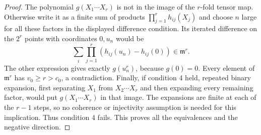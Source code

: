 \documentclass[11pt,a4paper]{article}
\theoremstyle{definition}
\begin{document}
\begin{proof}
The polynomial $g(X_1\cdots X_r)$ is not in the image of the
$r$-fold tensor map. Otherwise write it as a finite sum of
products $\prod_{j=1}^r h_{ij}(X_j)$ and choose $n$ large for
all these factors in the displayed difference condition.
Its iterated difference on the $2^r$ points with coordinates
$0,u_n$ would be
\[
 \sum_i\prod_{j=1}^r(h_{ij}(u_n)-h_{ij}(0))\in\mathfrak m^r.
\]
The other expression gives exactly $g(u_n^r)$, because $g(0)=0$.
Every element of $\mathfrak m^r$ has $v_0\ge r>c_0$, a
contradiction. Finally, if condition 4 held, repeated binary
expansion, first separating $X_1$ from $X_2\cdots X_r$ and
then expanding every remaining factor, would put
$g(X_1\cdots X_r)$ in that image. The expansions are finite at
each of the $r-1$ steps, so no coherence or injectivity assumption
is needed for this implication. Thus condition 4 fails.
This proves all the equivalences and the negative direction.
\end{proof}


\end{document}
